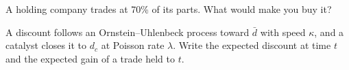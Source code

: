 \begin{interviewq}\label{iq:s1:share-classes-holding-companies-closed-end-funds-spacs:5}
A holding company trades at 70\% of its parts. What would make you buy it?
\end{interviewq}

\begin{interviewq}\label{iq:s1:share-classes-holding-companies-closed-end-funds-spacs:6}
A discount follows an Ornstein--Uhlenbeck process toward $\bar d$ with speed $\kappa$, and a catalyst closes it to $d_c$ at Poisson rate $\lambda$. Write the
expected discount at time $t$ and the expected gain of a trade held to $t$.
\end{interviewq}
